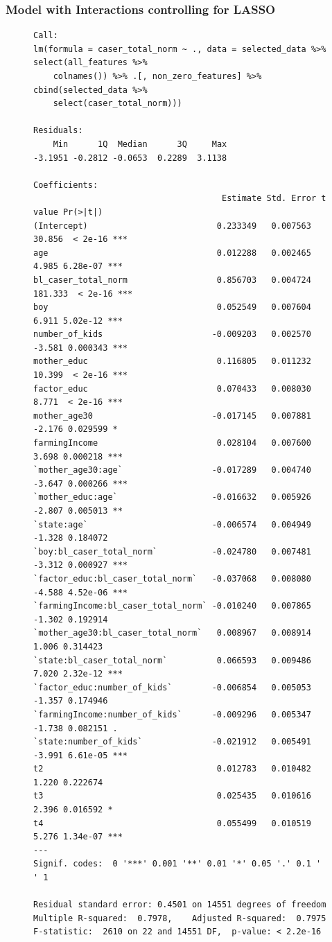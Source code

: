 \documentclass{article}
\begin{document}
\subsubsection*{Model with Interactions controlling for LASSO}
\begin{figure}[H]
\begin{lstlisting}[style=RstyleComment, caption=Model with Interactions controlling for LASSO]
Call:
lm(formula = caser_total_norm ~ ., data = selected_data %>% select(all_features %>% 
    colnames()) %>% .[, non_zero_features] %>% cbind(selected_data %>% 
    select(caser_total_norm)))

Residuals:
    Min      1Q  Median      3Q     Max 
-3.1951 -0.2812 -0.0653  0.2289  3.1138 

Coefficients:
                                      Estimate Std. Error t value Pr(>|t|)    
(Intercept)                          0.233349   0.007563  30.856  < 2e-16 ***
age                                  0.012288   0.002465   4.985 6.28e-07 ***
bl_caser_total_norm                  0.856703   0.004724 181.333  < 2e-16 ***
boy                                  0.052549   0.007604   6.911 5.02e-12 ***
number_of_kids                      -0.009203   0.002570  -3.581 0.000343 ***
mother_educ                          0.116805   0.011232  10.399  < 2e-16 ***
factor_educ                          0.070433   0.008030   8.771  < 2e-16 ***
mother_age30                        -0.017145   0.007881  -2.176 0.029599 *  
farmingIncome                        0.028104   0.007600   3.698 0.000218 ***
`mother_age30:age`                  -0.017289   0.004740  -3.647 0.000266 ***
`mother_educ:age`                   -0.016632   0.005926  -2.807 0.005013 ** 
`state:age`                         -0.006574   0.004949  -1.328 0.184072    
`boy:bl_caser_total_norm`           -0.024780   0.007481  -3.312 0.000927 ***
`factor_educ:bl_caser_total_norm`   -0.037068   0.008080  -4.588 4.52e-06 ***
`farmingIncome:bl_caser_total_norm` -0.010240   0.007865  -1.302 0.192914    
`mother_age30:bl_caser_total_norm`   0.008967   0.008914   1.006 0.314423    
`state:bl_caser_total_norm`          0.066593   0.009486   7.020 2.32e-12 ***
`factor_educ:number_of_kids`        -0.006854   0.005053  -1.357 0.174946    
`farmingIncome:number_of_kids`      -0.009296   0.005347  -1.738 0.082151 .  
`state:number_of_kids`              -0.021912   0.005491  -3.991 6.61e-05 ***
t2                                   0.012783   0.010482   1.220 0.222674    
t3                                   0.025435   0.010616   2.396 0.016592 *  
t4                                   0.055499   0.010519   5.276 1.34e-07 ***
---
Signif. codes:  0 '***' 0.001 '**' 0.01 '*' 0.05 '.' 0.1 ' ' 1

Residual standard error: 0.4501 on 14551 degrees of freedom
Multiple R-squared:  0.7978,	Adjusted R-squared:  0.7975 
F-statistic:  2610 on 22 and 14551 DF,  p-value: < 2.2e-16
\end{lstlisting}
\end{figure}
\end{document}
